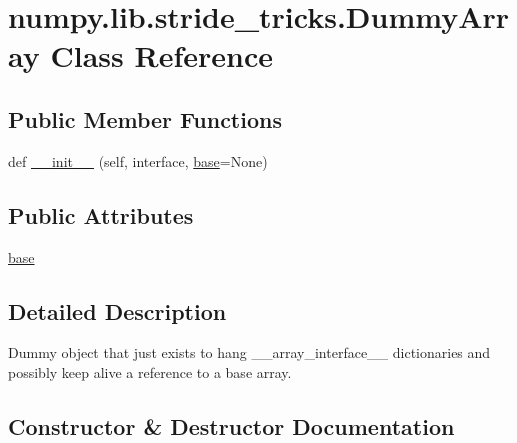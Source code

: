 \hypertarget{classnumpy_1_1lib_1_1stride__tricks_1_1DummyArray}{}\section{numpy.\+lib.\+stride\+\_\+tricks.\+Dummy\+Array Class Reference}
\label{classnumpy_1_1lib_1_1stride__tricks_1_1DummyArray}
\subsection*{Public Member Functions}
\begin{DoxyCompactItemize}
\item 
def \hyperlink{classnumpy_1_1lib_1_1stride__tricks_1_1DummyArray_a8faadc3ab04ccffe08776ee44c20c59b}{\+\_\+\+\_\+init\+\_\+\+\_\+} (self, interface, \hyperlink{classnumpy_1_1lib_1_1stride__tricks_1_1DummyArray_a0a3203b47f4b728b77dfe418ae2f427e}{base}=None)
\end{DoxyCompactItemize}
\subsection*{Public Attributes}
\begin{DoxyCompactItemize}
\item 
\hyperlink{classnumpy_1_1lib_1_1stride__tricks_1_1DummyArray_a0a3203b47f4b728b77dfe418ae2f427e}{base}
\end{DoxyCompactItemize}


\subsection{Detailed Description}
\begin{DoxyVerb}Dummy object that just exists to hang __array_interface__ dictionaries
and possibly keep alive a reference to a base array.
\end{DoxyVerb}
 

\subsection{Constructor \& Destructor Documentation}
\mbox{\label{classnumpy_1_1lib_1_1stride__tricks_1_1DummyArray_a8faadc3ab04ccffe08776ee44c20c59b}} 
